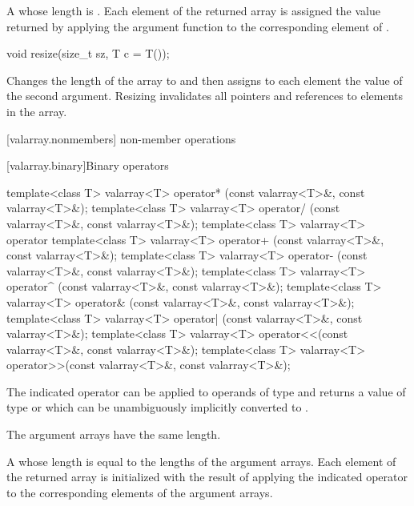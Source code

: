 \begin{itemdescr}
\pnum
\returns
A  whose length is .
Each element of the returned array is assigned
the value returned by applying the argument function to the
corresponding element of .
\end{itemdescr}

%
\begin{itemdecl}
void resize(size_t sz, T c = T());
\end{itemdecl}

\begin{itemdescr}
\pnum
\effects
Changes the length of the  array to 
and then assigns to each element the value of the second argument.
Resizing invalidates all pointers and references to elements in the array.
\end{itemdescr}

[valarray.nonmembers]{ non-member operations}

[valarray.binary]{Binary operators}

%
%
%
%
%
%
%
%
%
%
\begin{itemdecl}
template<class T> valarray<T> operator* (const valarray<T>&, const valarray<T>&);
template<class T> valarray<T> operator/ (const valarray<T>&, const valarray<T>&);
template<class T> valarray<T> operator%
template<class T> valarray<T> operator+ (const valarray<T>&, const valarray<T>&);
template<class T> valarray<T> operator- (const valarray<T>&, const valarray<T>&);
template<class T> valarray<T> operator^ (const valarray<T>&, const valarray<T>&);
template<class T> valarray<T> operator& (const valarray<T>&, const valarray<T>&);
template<class T> valarray<T> operator| (const valarray<T>&, const valarray<T>&);
template<class T> valarray<T> operator<<(const valarray<T>&, const valarray<T>&);
template<class T> valarray<T> operator>>(const valarray<T>&, const valarray<T>&);
\end{itemdecl}

\begin{itemdescr}
\pnum
\mandates
The indicated operator can be applied to operands of type  and returns
a value of type  or which can be unambiguously
implicitly converted to .

\pnum
\expects
The argument arrays have the same length.

\pnum
\returns
A  whose length is equal to the
lengths of the argument arrays.
Each element of the returned array is
initialized with the result of applying the indicated operator to the
corresponding elements of the argument arrays.
\end{itemdescr}

